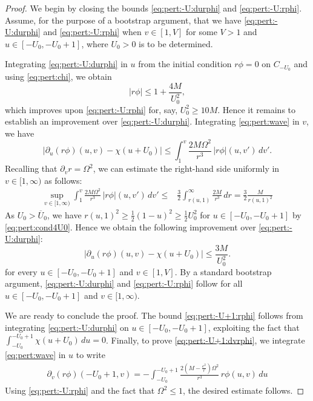 \documentclass[12 pt, reqno]{amsart}
\theoremstyle{definition}
\theoremstyle{remark}
\numberwithin{equation}{section}
\newcommand{\abs}[1]{\vert#1\vert}
\newcommand{\ud}{d}
\newcommand{\rd}{\partial}
\newcommand{\0}{\emptyset}
\newcommand{\Omg}{\Omega}
\newcommand{\Ufree}{U_{0}}
\newcommand{\Ufixed}{\overline{U}_{0}}
\begin{document}
\begin{proof} 
We begin by closing the bounds \eqref{eq:pert:-U:durphi} and \eqref{eq:pert:-U:rphi}. Assume, for the purpose of a bootstrap argument, that we have \eqref{eq:pert:-U:durphi} and \eqref{eq:pert:-U:rphi} when $v \in [1, V]$ for some $V > 1$ and $u \in [-\Ufree, -\Ufree+1]$, where $\Ufree > 0$ is to be determined. 

Integrating \eqref{eq:pert:-U:durphi} in $u$ from the initial condition $r \phi = 0$ on $C_{-\Ufree}$ and using \eqref{eq:pert:chi}, we obtain
\begin{equation} \label{eq:pert:-U:rphi:imp}
	\abs{r \phi} \leq 1 + \frac{4M}{\Ufree^{2}},
\end{equation}
which improves upon \eqref{eq:pert:-U:rphi} for, say, $\Ufree^{2} \geq 10 M$. Hence it remains to establish an improvement over \eqref{eq:pert:-U:durphi}. Integrating \eqref{eq:pert:wave} in $v$, we have
\begin{equation*}
	\abs{\rd_{u}(r \phi)(u, v) - \chi(u+\Ufree)} \leq  \int_{1}^{v} \frac{2M \Omg^2}{r^{3}}\,  \abs{r \phi} (u, v') \, \ud v'.
\end{equation*}
Recalling that $\rd_{v} r = \Omg^2$, we can estimate the right-hand side uniformly in $v \in [1, \infty)$ as follows:
\begin{align*}
	\sup_{v \in [1, \infty)} \int_{1}^{v} \frac{2M \Omg^2}{r^{3}}\, \abs{ r \phi }(u, v') \, \ud v'
	\leq & \frac{3}{2} \int_{r(u, 1)}^{\infty} \frac{2M}{r^{3}} \, \ud r 
	= \frac{3}{2} \frac{M}{r(u, 1)^{2}}
\end{align*}
As $\Ufree > \Ufixed$, we have $r(u, 1)^{2} \geq \frac{1}{2} (1-u)^{2} \geq \frac{1}{2} \Ufree^{2}$ for $u \in [-\Ufree, -\Ufree+1]$ by \eqref{eq:pert:cond4U0}. Hence we obtain the following improvement over \eqref{eq:pert:-U:durphi}:
\begin{equation} \label{eq:pert:-U:durphi:imp}
	\abs{\rd_{u}(r \phi)(u, v) - \chi(u+\Ufree)} \leq \frac{3M}{\Ufree^{2}}.
\end{equation}
for every $u \in [-\Ufree, -\Ufree+1]$ and $v \in [1, V]$. By a standard bootstrap argument, \eqref{eq:pert:-U:durphi} and \eqref{eq:pert:-U:rphi} follow for all $u \in [-\Ufree, -\Ufree+1]$ and $v \in [1, \infty)$. 

We are ready to conclude the proof. The bound \eqref{eq:pert:-U+1:rphi} follows from integrating \eqref{eq:pert:-U:durphi} on $u \in [-\Ufree, -\Ufree+1]$, exploiting the fact that $\int_{-\Ufree}^{-\Ufree+1} \chi(u+\Ufree) \, \ud u = 0$. Finally, to prove \eqref{eq:pert:-U+1:dvrphi}, we integrate \eqref{eq:pert:wave} in $u$ to write
\begin{align*}
	\rd_{v}(r \phi)(-\Ufree+1, v) = - \int_{-\Ufree}^{-\Ufree+1} \frac{2(M-\frac{e^{2}}{r}) \Omg^2}{r^{3}} \, r \phi(u, v) \, \ud u
\end{align*}
Using \eqref{eq:pert:-U:rphi} and the fact that $\Omg^2 \leq 1$, the desired estimate follows. \qedhere
\end{proof}
\end{document}
